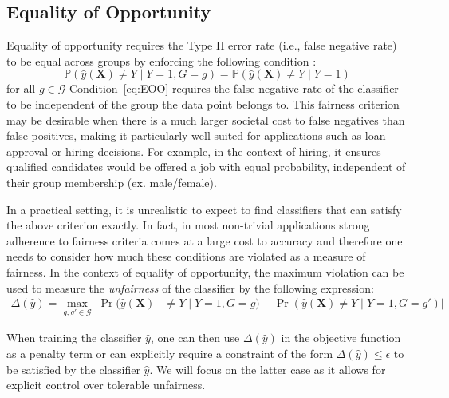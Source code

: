 \documentclass[twoside,11pt]{article}
\begin{document}
\subsection{Equality of Opportunity} 
Equality of opportunity requires the Type II error rate (i.e., false negative rate) to be equal across groups by enforcing the following condition \citep{hardt2016equality}: 	
	\begin{equation} 
    {\mathbb P} (\hat{y}(\textbf{X}) \neq Y  \mid Y = 1, G = g) = {\mathbb P} (\hat{y}(\textbf{X}) \neq Y \mid Y = 1)  \label{eq:EOO}
    \end{equation}
 for all $ g \in \mathcal{G} $ Condition~\eqref{eq:EOO} requires the false negative rate of the classifier to be independent of the group the data point belongs to. This fairness criterion may be desirable %
when there is a much larger societal cost to false negatives than false positives, making it particularly well-suited for applications such as loan approval or hiring decisions. For example, in the context of hiring, it ensures qualified candidates would be offered a job with equal probability, independent of their group membership (ex. male/female). 
    
In a practical setting, it is unrealistic to expect to find classifiers that can satisfy the above criterion exactly. In fact, in most non-trivial applications strong adherence to fairness criteria comes at a large cost to accuracy \citep{kleinberg2016inherent} and therefore one needs to consider how much these conditions are violated as a measure of fairness. In the context of equality of opportunity, the maximum violation can be used to measure the {\em unfairness} of the classifier by the following expression:
\smallskip
\begin{align*}   \Delta(\hat{y})=  \max_{g, g' \in \mathcal{G}} \Big|\Pr(\hat{y}(\textbf{X})& \neq Y \mid Y = 1, G = g) - \Pr(\hat{y}(\textbf{X}) \neq Y \mid Y = 1, G = g') \Big|
   \end{align*}

When training the classifier $\hat{y}$, one can then use  $  \Delta(\hat{y})$ in the objective function as a penalty term or can explicitly require a constraint of the form $\Delta(\hat{y})\le\epsilon$ to be satisfied by the classifier $\hat{y}$. We will focus on the latter case as it allows for explicit control over tolerable unfairness.
\end{document}
